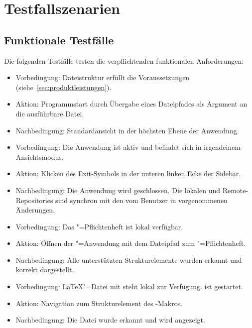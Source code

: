 \section{Testfallszenarien}
\label{sec:testfallszenarien}

\subsection{Funktionale Testfälle}
\label{subsec:funktionale-testfaelle}

Die folgenden Testfälle testen die verpflichtenden funktionalen Anforderungen:

\begin{itemize}
  \item Vorbedingung: Dateistruktur erfüllt die Voraussetzungen (siehe~\ref{sec:produktleistungen}).
  \item Aktion: Programmstart durch Übergabe eines Dateipfades als Argument an die ausführbare Datei.
  \item Nachbedingung: Standardansicht in der höchsten Ebene der Anwendung.
\end{itemize}

\begin{itemize}
  \item Vorbedingung: Die Anwendung ist aktiv und befindet sich in irgendeinem Ansichtsmodus.
  \item Aktion: Klicken des Exit-Symbols in der unteren linken Ecke der Sidebar.
  \item Nachbedingung: Die Anwendung wird geschlossen.
  Die lokalen und Remote-Repositories sind synchron mit den vom Benutzer in \texla{} vorgenommenen Änderungen.
\end{itemize}

\begin{itemize}
  \item Vorbedingung: Das \texla"=Pflichtenheft ist lokal verfügbar.
  \item Aktion: Öffnen der \texla"=Anwendung mit dem Dateipfad zum \texla"=Pflichtenheft.
  \item Nachbedingung: Alle unterstützten Strukturelemente wurden erkannt und korrekt dargestellt.
\end{itemize}

\clearpage

\begin{itemize}
  \item Vorbedingung: \LaTeX"=Datei mit \verb|| steht lokal zur Verfügung.
  \texla{} ist gestartet.
  \item Aktion: Navigation zum Strukturelement des \verb||-Makros.
  \item Nachbedingung: Die Datei wurde erkannt und wird angezeigt.
\end{itemize}

